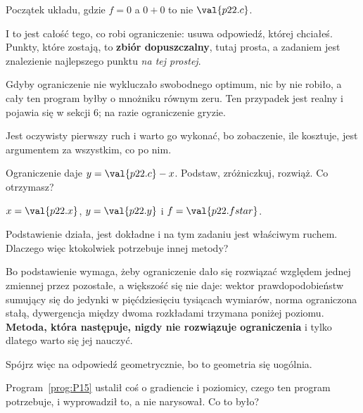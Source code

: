 \begin{fr}
\begin{ansblock}
Początek układu, gdzie $f = 0$ \dash{} a $0 + 0$ to nie $\val{p22.c}$.
\end{ansblock}

I to jest całość tego, co robi ograniczenie: usuwa odpowiedź, której chciałeś.
Punkty, które zostają, to \textbf{zbiór dopuszczalny}, tutaj prosta, a zadaniem
jest znalezienie najlepszego punktu \emph{na tej prostej}.

\begin{note}
Gdyby ograniczenie nie wykluczało swobodnego optimum, nic by nie robiło, a cały
ten program byłby o mnożniku równym zeru. Ten przypadek jest realny i pojawia
się w sekcji 6; na razie ograniczenie gryzie.
\end{note}
\end{fr}

\begin{fr}
Jest oczywisty pierwszy ruch i warto go wykonać, bo zobaczenie, ile kosztuje,
jest argumentem za wszystkim, co po nim.

Ograniczenie daje $y = \val{p22.c} - x$. Podstaw, zróżniczkuj, rozwiąż. Co
otrzymasz?
\nextframe
\end{fr}

\begin{fr}
\begin{ansblock}
$x = \val{p22.x}$, $y = \val{p22.y}$ i $f = \val{p22.fstar}$.
\end{ansblock}

Podstawienie działa, jest dokładne i na tym zadaniu jest właściwym ruchem.
Dlaczego więc ktokolwiek potrzebuje innej metody?

Bo podstawienie wymaga, żeby ograniczenie dało się rozwiązać względem jednej
zmiennej przez pozostałe, a większość się nie daje: wektor prawdopodobieństw
sumujący się do jedynki w pięćdziesięciu tysiącach wymiarów, norma ograniczona
stałą, dywergencja między dwoma rozkładami trzymana poniżej poziomu.
\textbf{Metoda, która następuje, nigdy nie rozwiązuje ograniczenia} i tylko
dlatego warto się jej nauczyć.
\end{fr}

\begin{fr}
Spójrz więc na odpowiedź geometrycznie, bo to geometria się uogólnia.

Program~\ref{prog:P15} ustalił coś o gradiencie i poziomicy, czego ten program
potrzebuje, i wyprowadził to, a nie narysował. Co to było?
\dotline
\nextframe
\end{fr}

